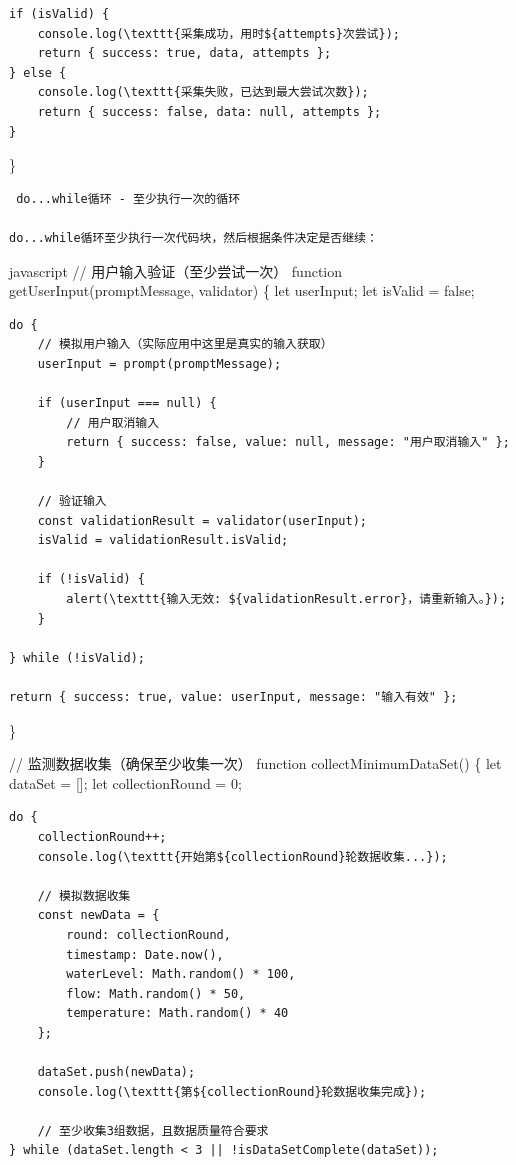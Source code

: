 {\begin{verbatim}
if (isValid) {
    console.log(\texttt{采集成功，用时${attempts}次尝试});
    return { success: true, data, attempts };
} else {
    console.log(\texttt{采集失败，已达到最大尝试次数});
    return { success: false, data: null, attempts };
}
\end{verbatim}

\}

\begin{lstlisting}
 do...while循环 - 至少执行一次的循环

do...while循环至少执行一次代码块，然后根据条件决定是否继续：
\end{lstlisting}

javascript // 用户输入验证（至少尝试一次） function getUserInput(promptMessage, validator) \{ let userInput; let isValid = false;

\begin{verbatim}
do {
    // 模拟用户输入（实际应用中这里是真实的输入获取）
    userInput = prompt(promptMessage);
    
    if (userInput === null) {
        // 用户取消输入
        return { success: false, value: null, message: "用户取消输入" };
    }
    
    // 验证输入
    const validationResult = validator(userInput);
    isValid = validationResult.isValid;
    
    if (!isValid) {
        alert(\texttt{输入无效: ${validationResult.error}，请重新输入。});
    }
    
} while (!isValid);

return { success: true, value: userInput, message: "输入有效" };
\end{verbatim}

\}

// 监测数据收集（确保至少收集一次） function collectMinimumDataSet() \{ let dataSet = {[}{]}; let collectionRound = 0;

\begin{verbatim}
do {
    collectionRound++;
    console.log(\texttt{开始第${collectionRound}轮数据收集...});
    
    // 模拟数据收集
    const newData = {
        round: collectionRound,
        timestamp: Date.now(),
        waterLevel: Math.random() * 100,
        flow: Math.random() * 50,
        temperature: Math.random() * 40
    };
    
    dataSet.push(newData);
    console.log(\texttt{第${collectionRound}轮数据收集完成});
    
    // 至少收集3组数据，且数据质量符合要求
} while (dataSet.length < 3 || !isDataSetComplete(dataSet));


\end{verbatim}}
